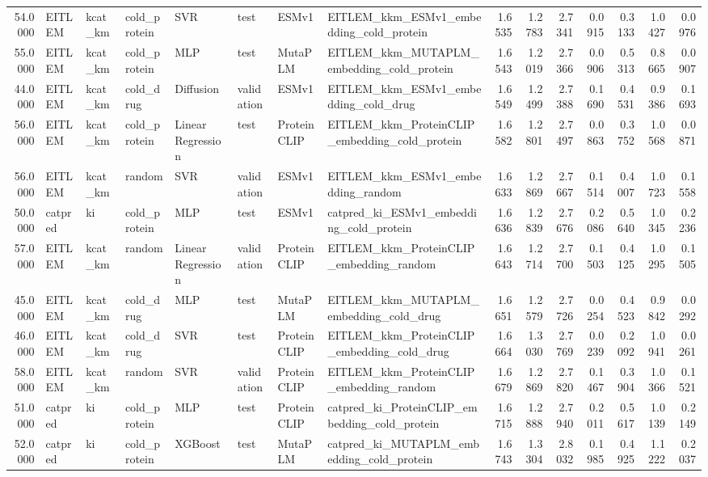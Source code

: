 \begin{tabular}{rlllllllrrrrrrr}
54.0000 & EITLEM & kcat_km & cold_protein & SVR & test & ESMv1 & EITLEM_kkm_ESMv1_embedding_cold_protein & 1.6535 & 1.2783 & 2.7341 & 0.0915 & 0.3133 & 1.0427 & 0.0976 \\
55.0000 & EITLEM & kcat_km & cold_protein & MLP & test & MutaPLM & EITLEM_kkm_MUTAPLM_embedding_cold_protein & 1.6543 & 1.2019 & 2.7366 & 0.0906 & 0.5313 & 0.8665 & 0.0907 \\
44.0000 & EITLEM & kcat_km & cold_drug & Diffusion & validation & ESMv1 & EITLEM_kkm_ESMv1_embedding_cold_drug & 1.6549 & 1.2499 & 2.7388 & 0.1690 & 0.4531 & 0.9386 & 0.1693 \\
56.0000 & EITLEM & kcat_km & cold_protein & Linear Regression & test & ProteinCLIP & EITLEM_kkm_ProteinCLIP_embedding_cold_protein & 1.6582 & 1.2801 & 2.7497 & 0.0863 & 0.3752 & 1.0568 & 0.0871 \\
56.0000 & EITLEM & kcat_km & random & SVR & validation & ESMv1 & EITLEM_kkm_ESMv1_embedding_random & 1.6633 & 1.2869 & 2.7667 & 0.1514 & 0.4007 & 1.0723 & 0.1558 \\
50.0000 & catpred & ki & cold_protein & MLP & test & ESMv1 & catpred_ki_ESMv1_embedding_cold_protein & 1.6636 & 1.2839 & 2.7676 & 0.2086 & 0.5640 & 1.0345 & 0.2236 \\
57.0000 & EITLEM & kcat_km & random & Linear Regression & validation & ProteinCLIP & EITLEM_kkm_ProteinCLIP_embedding_random & 1.6643 & 1.2714 & 2.7700 & 0.1503 & 0.4125 & 1.0295 & 0.1505 \\
45.0000 & EITLEM & kcat_km & cold_drug & MLP & test & MutaPLM & EITLEM_kkm_MUTAPLM_embedding_cold_drug & 1.6651 & 1.2579 & 2.7726 & 0.0254 & 0.4523 & 0.9842 & 0.0292 \\
46.0000 & EITLEM & kcat_km & cold_drug & SVR & test & ProteinCLIP & EITLEM_kkm_ProteinCLIP_embedding_cold_drug & 1.6664 & 1.3030 & 2.7769 & 0.0239 & 0.2092 & 1.0941 & 0.0261 \\
58.0000 & EITLEM & kcat_km & random & SVR & validation & ProteinCLIP & EITLEM_kkm_ProteinCLIP_embedding_random & 1.6679 & 1.2869 & 2.7820 & 0.1467 & 0.3904 & 1.0366 & 0.1521 \\
51.0000 & catpred & ki & cold_protein & MLP & test & ProteinCLIP & catpred_ki_ProteinCLIP_embedding_cold_protein & 1.6715 & 1.2888 & 2.7940 & 0.2011 & 0.5617 & 1.0139 & 0.2149 \\
52.0000 & catpred & ki & cold_protein & XGBoost & test & MutaPLM & catpred_ki_MUTAPLM_embedding_cold_protein & 1.6743 & 1.3304 & 2.8032 & 0.1985 & 0.4925 & 1.1222 & 0.2037 \\

\end{tabular}
